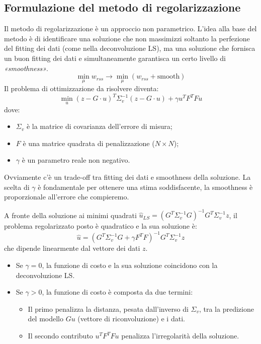 \subsection{Formulazione del metodo di regolarizzazione}
Il metodo di regolarizzazione è un approccio non parametrico. L'idea alla base del metodo è di identificare una soluzione che non massimizzi soltanto la perfezione del fitting dei dati (come nella deconvoluzione LS), ma una soluzione che fornisca un buon fitting dei dati e simultaneamente garantisca un certo livello di \textit{«smoothness»}.
\[
\min_{\mu}{w_{rss}} \longrightarrow \min_{\mu}{(w_{rss} + \text{smooth})}
\]
Il problema di ottimizzazione da risolvere diventa:
\[
    \min_{u} (z - G \cdot u)^T \Sigma_v^{-1} (z - G \cdot u) + \gamma u^T F^T F u
\]
dove:
\begin{itemize}
    \item $\Sigma_v$ è la matrice di covarianza dell'errore di misura;
    \item $F$ è una matrice quadrata di penalizzazione ($N \times N$);
    \item $\gamma$ è un parametro reale non negativo.
\end{itemize}
Ovviamente c'è un trade-off tra fitting dei dati e smoothness della soluzione. La scelta di $\gamma$ è fondamentale per ottenere una stima soddisfacente, la smoothness è proporzionale all'errore che compieremo.

A fronte della soluzione ai minimi quadrati $\hat{u}_{LS} = (G^T \Sigma_v^{-1} G)^{-1} G^T \Sigma_v^{-1} z$, il problema regolarizzato posto è quadratico e la sua soluzione è:
\[
    \hat{u} = (G^T \Sigma_v^{-1} G + \gamma F^T F)^{-1} G^T \Sigma_v^{-1} z
\]
che dipende linearmente dal vettore dei dati $z$.
\begin{itemize}
    \item Se $\gamma = 0$, la funzione di costo e la sua soluzione coincidono con la deconvoluzione LS.
    \item Se $\gamma > 0$, la funzione di costo è composta da due termini:
    \begin{itemize}
        \item Il primo penalizza la distanza, pesata dall'inverso di $\Sigma_v$, tra la predizione del modello $Gu$ (vettore di riconvoluzione) e i dati.
        \item Il secondo contributo $u^T F^T F u$ penalizza l'irregolarità della soluzione.
    \end{itemize}
\end{itemize}

